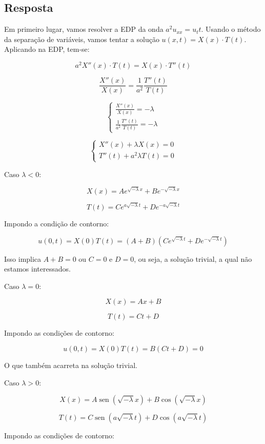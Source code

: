 \documentclass[12pt, a4paper, portuguese]{fphw}
\DeclareMathOperator{\sen}{sen}
\begin{document}
\subsection*{Resposta}

Em primeiro lugar, vamos resolver a EDP da onda $ a^2 u_{xx} = u_tt $. Usando o método da separação de variáveis, vamos tentar a solução $ u(x, t) = X(x) \cdot T(t) $. Aplicando na EDP, tem-se:

$$
a^2 X''(x) \cdot T(t) = X(x) \cdot T''(t)
$$

$$
\frac{X''(x)}{X(x)} = \frac{1}{a^2} \frac{T''(t)}{T(t)}
$$

$$
\begin{cases}
\frac{X''(x)}{X(x)} = -\lambda \\
\frac{1}{a^2} \frac{T''(t)}{T(t)} = -\lambda
\end{cases}
$$

$$
\begin{cases}
X''(x) + \lambda X(x) = 0 \\
T''(t) + a^2 \lambda T(t) = 0
\end{cases}
$$

Caso $ \lambda < 0 $:

$$
X(x) = Ae^{\sqrt{-\lambda}x} + Be^{-\sqrt{-\lambda}x}
$$

$$
T(t) = Ce^{a\sqrt{-\lambda}t} + De^{-a\sqrt{-\lambda}t}
$$

Impondo a condição de contorno:

$$
u(0, t) = X(0)T(t) = (A + B) (Ce^{\sqrt{-\lambda}t} + De^{-\sqrt{-\lambda}t})
$$

Isso implica $ A + B = 0 $ ou $ C = 0 $ e $ D = 0 $, ou seja, a solução trivial, a qual não estamos interessados.

Caso $ \lambda = 0 $:

$$
X(x) = Ax + B
$$

$$
T(t) = Ct + D
$$

Impondo as condições de contorno:

$$
u(0, t) = X(0)T(t) = B(Ct + D) = 0
$$

O que também acarreta na solução trivial.

Caso $ \lambda > 0 $:

$$
X(x) = A \sen \left( \sqrt{-\lambda} x \right) + B \cos \left( \sqrt{-\lambda} x \right)
$$

$$
T(t) = C \sen \left( a\sqrt{-\lambda} t \right) + D \cos \left( a\sqrt{-\lambda} t \right)
$$

Impondo as condições de contorno:
\end{document}
